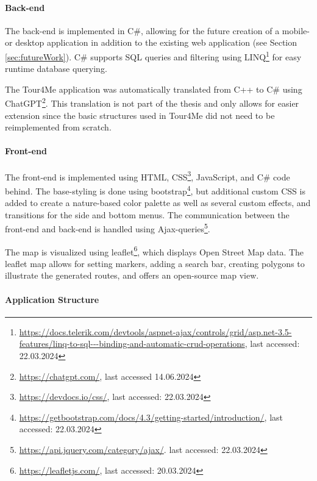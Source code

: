 \paragraph{Back-end}

The back-end is implemented in C\#, allowing for the future creation of a mobile- or desktop application in addition to the existing web application (see Section \ref{sec:futureWork}).
C\# supports SQL queries and filtering using LINQ\footnote{\url{https://docs.telerik.com/devtools/aspnet-ajax/controls/grid/asp.net-3.5-features/linq-to-sql---binding-and-automatic-crud-operations}, last accessed: 22.03.2024} for easy runtime database querying.

The Tour4Me application was automatically translated from C++ to C\# using ChatGPT\footnote{\url{https://chatgpt.com/}, last accessed 14.06.2024}. 
This translation is not part of the thesis and only allows for easier extension since the basic structures used in Tour4Me did not need to be reimplemented from scratch.

\paragraph{Front-end}

The front-end is implemented using HTML, CSS\footnote{\url{https://devdocs.io/css/}, last accessed: 22.03.2024}, JavaScript, and C\# code behind. 
The base-styling is done using bootstrap\footnote{\url{https://getbootstrap.com/docs/4.3/getting-started/introduction/}, last accessed: 22.03.2024}, but additional custom CSS is added to create a nature-based color palette as well as several custom effects, and transitions for the side and bottom menus.
The communication between the front-end and back-end is handled using  Ajax-queries\footnote{\url{https://api.jquery.com/category/ajax/}. last accessed: 22.03.2024}.

The map is visualized using leaflet\footnote{\url{https://leafletjs.com/}, last accessed: 20.03.2024}, which displays Open Street Map data.
The leaflet map allows for setting markers, adding a search bar, creating polygons to illustrate the generated routes, and offers an open-source map view. 

\paragraph{Application Structure}

